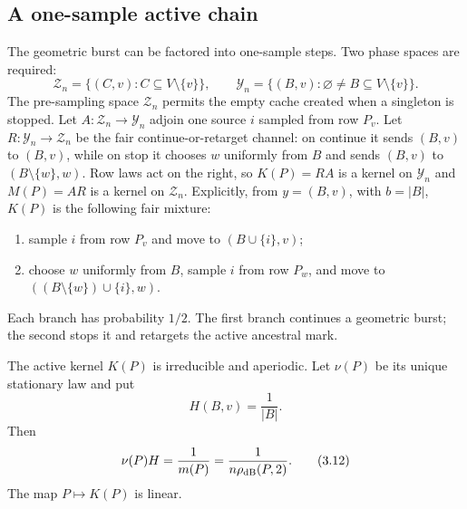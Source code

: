 \subsection{A one-sample active chain}

The geometric burst can be factored into one-sample steps.  Two phase spaces
are required:
\[
 \mathcal Z_n=\{(C,v):C\subseteq V\setminus\{v\}\},\qquad
 \mathcal Y_n=\{(B,v):\varnothing\ne B\subseteq V\setminus\{v\}\}.
                                                                    \tag{3.10}\label{3.10}
\]
The pre-sampling space $\mathcal Z_n$ permits the empty cache created when a
singleton is stopped.  Let $A:\mathcal Z_n\to\mathcal Y_n$ adjoin one source
$i$ sampled from row $P_v$.  Let $R:\mathcal Y_n\to\mathcal Z_n$ be the fair
continue-or-retarget channel: on continue it sends $(B,v)$ to $(B,v)$, while
on stop it chooses $w$ uniformly from $B$ and sends $(B,v)$ to
$(B\setminus\{w\},w)$.  Row laws act on the right, so $K(P)=RA$ is a kernel
on $\mathcal Y_n$ and $M(P)=AR$ is a kernel on $\mathcal Z_n$.  Explicitly,
from $y=(B,v)$, with $b=|B|$, $K(P)$ is the following fair mixture:
\begin{enumerate}
\item sample $i$ from row $P_v$ and move to $(B\cup\{i\},v)$;
\item choose $w$ uniformly from $B$, sample $i$ from row $P_w$, and move to
      $((B\setminus\{w\})\cup\{i\},w)$.
\end{enumerate}
Each branch has probability $1/2$.  The first branch continues a geometric
burst; the second stops it and retargets the active ancestral mark.

\begin{lemma}\label{lem:active}
The active kernel $K(P)$ is irreducible and aperiodic.  Let $\nu(P)$ be its
unique stationary law and put
\[
 H(B,v)=\frac1{|B|}.                                        \tag{3.11}\label{3.11}
\]
Then
\[
 \nu(P)H=\frac1{m(P)}=\frac1{n\rho_{\mathrm{dB}}(P,2)}.             \tag{3.12}\label{3.12}
\]
The map $P\mapsto K(P)$ is linear.
\end{lemma}

